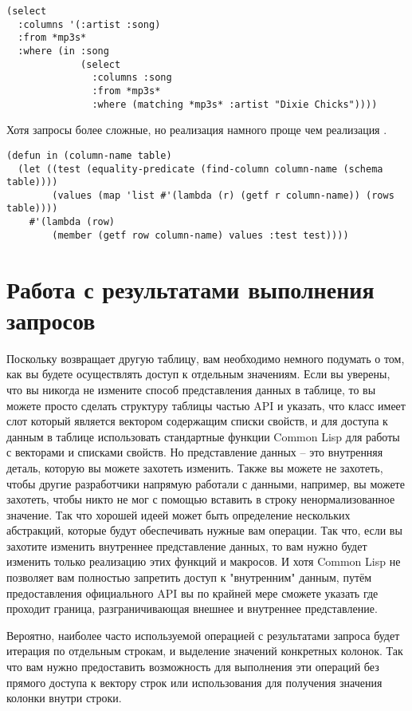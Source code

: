 \begin{lstlisting}
(select
  :columns '(:artist :song)
  :from *mp3s*
  :where (in :song 
             (select
               :columns :song
               :from *mp3s*
               :where (matching *mp3s* :artist "Dixie Chicks"))))
\end{lstlisting}

Хотя запросы более сложные, но реализация  намного проще чем реализация
.

\begin{lstlisting}
(defun in (column-name table)
  (let ((test (equality-predicate (find-column column-name (schema table))))
        (values (map 'list #'(lambda (r) (getf r column-name)) (rows table))))
    #'(lambda (row)
        (member (getf row column-name) values :test test))))
\end{lstlisting}

\section{Работа с результатами выполнения запросов}

Поскольку  возвращает другую таблицу, вам необходимо немного подумать о том,
как вы будете осуществлять доступ к отдельным значениям.  Если вы уверены, что вы никогда
не измените способ представления данных в таблице, то вы можете просто сделать структуру
таблицы частью API и указать, что класс  имеет слот  который
является вектором содержащим списки свойств, и для доступа к данным в таблице использовать
стандартные функции Common Lisp для работы с векторами и списками свойств.  Но
представление данных -- это внутренняя деталь, которую вы можете захотеть изменить.  Также
вы можете не захотеть, чтобы другие разработчики напрямую работали с данными, например, вы
можете захотеть, чтобы никто не мог с помощью  вставить в строку
ненормализованное значение.  Так что хорошей идеей может быть определение нескольких
абстракций, которые будут обеспечивать нужные вам операции.  Так что, если вы захотите
изменить внутреннее представление данных, то вам нужно будет изменить только реализацию
этих функций и макросов.  И хотя Common Lisp не позволяет вам полностью запретить доступ к
"внутренним" данным, путём предоставления официального API вы по крайней мере сможете
указать где проходит граница, разграничивающая внешнее и внутреннее представление.

Вероятно, наиболее часто используемой операцией с результатами запроса будет итерация по
отдельным строкам, и выделение значений конкретных колонок.  Так что вам нужно
предоставить возможность для выполнения эти операций без прямого доступа к вектору строк
или использования  для получения значения колонки внутри строки.

